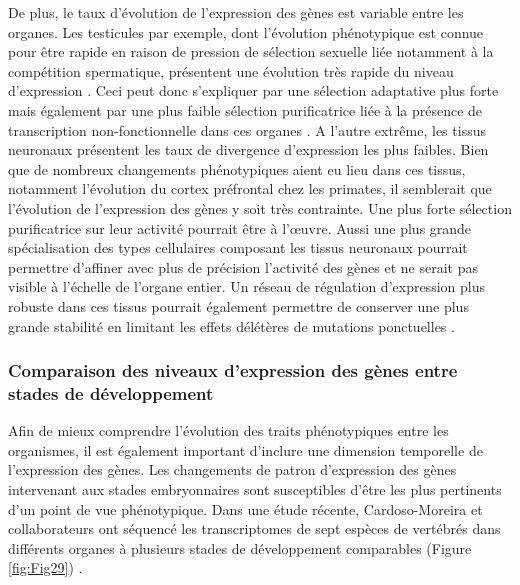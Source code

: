 De plus, le taux d’évolution de l’expression des gènes est variable entre les organes. Les testicules par exemple, dont l’évolution phénotypique est connue pour être rapide en raison de pression de sélection sexuelle liée notamment à la compétition spermatique, présentent une évolution très rapide du niveau d’expression \citep{birkhead_postcopulatory_2002}. Ceci peut donc s’expliquer par une sélection adaptative plus forte mais également par une plus faible sélection purificatrice liée à la présence de transcription non-fonctionnelle dans ces organes \citep{soumillon_cellular_2013}. A l’autre extrême, les tissus neuronaux présentent les taux de divergence d’expression les plus faibles. Bien que de nombreux changements phénotypiques aient eu lieu dans ces tissus, notamment l'évolution du cortex préfrontal chez les primates, il semblerait que l’évolution de l’expression des gènes y soit très contrainte. Une plus forte sélection purificatrice sur leur activité pourrait être à l'œuvre. Aussi une plus grande spécialisation des types cellulaires composant les tissus neuronaux pourrait permettre d’affiner avec plus de précision l’activité des gènes et ne serait pas visible à l’échelle de l’organe entier. Un réseau de régulation d’expression plus robuste dans ces tissus pourrait également permettre de conserver une plus grande stabilité en limitant les effets délétères de mutations ponctuelles \citep{khaitovich_evolution_2006}.

\subsubsection{Comparaison des niveaux d’expression des gènes entre stades de développement}
\label{subsub:variation-stade}

Afin de mieux comprendre l’évolution des traits phénotypiques entre les organismes, il est également important d’inclure une dimension temporelle de l’expression des gènes. Les changements de patron d’expression des gènes intervenant aux stades embryonnaires sont susceptibles d’être les plus pertinents d’un point de vue phénotypique. Dans une étude récente, Cardoso-Moreira et collaborateurs ont séquencé les \glspl{transcriptome} de sept espèces de vertébrés dans différents organes à plusieurs stades de développement comparables (Figure \ref{fig:Fig29}) \citep{cardoso-moreira_gene_2019}.

